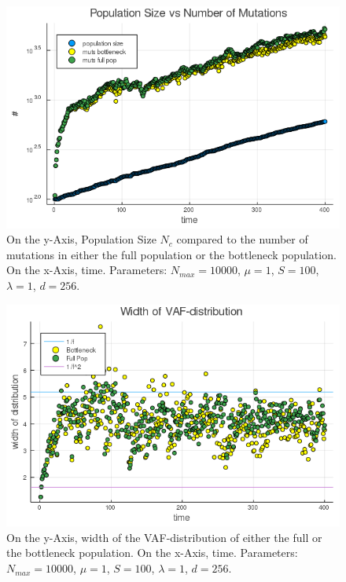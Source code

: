 \documentclass{article}
\numberwithin{equation}{subsection}
\begin{document}
	
	\begin{figure}[h!]
	\centering
	\includegraphics[width=\linewidth]{Figures/LogGrowth/document/vargrowth/LogVarTimesMutLive_N10000_mu1_t400_d256_C0}
	
	\caption{On the y-Axis, Population Size $N_c$ compared to the number of mutations in either the full population or the bottleneck population. On the x-Axis, time. Parameters: $ N_{max} = 10000$, $\mu = 1 $, $ S = 100 $, $ \lambda = 1$, $ d = 256 $.}
	\label{fig::NMutstimeD}
	\end{figure}

	\begin{figure}[h!]
	\centering
	\includegraphics[width=\linewidth]{Figures/LogGrowth/document/vargrowth/LogVarTimesAlt_N10000_mu1_t400_d256_C0}
	
	\caption{On the y-Axis, width of the VAF-distribution of either the full or the bottleneck population. On the x-Axis, time. Parameters: $ N_{max} = 10000$, $\mu = 1 $, $ S = 100 $, $ \lambda = 1$, $ d = 256 $.}
	\label{fig::WidthD}
	\end{figure}
\end{document}
